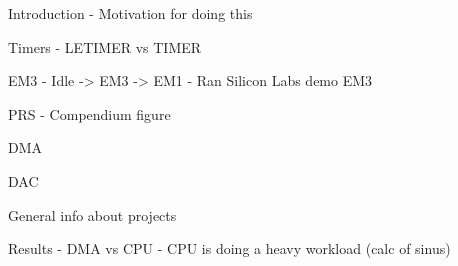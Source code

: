 Introduction
    - Motivation for doing this

Timers
    - LETIMER vs TIMER

EM3
    - Idle -> EM3 -> EM1
    - Ran Silicon Labs demo EM3

PRS
    - Compendium figure

DMA

DAC

General info about projects

Results
    - DMA vs CPU
        - CPU is doing a heavy workload (calc of sinus)
    